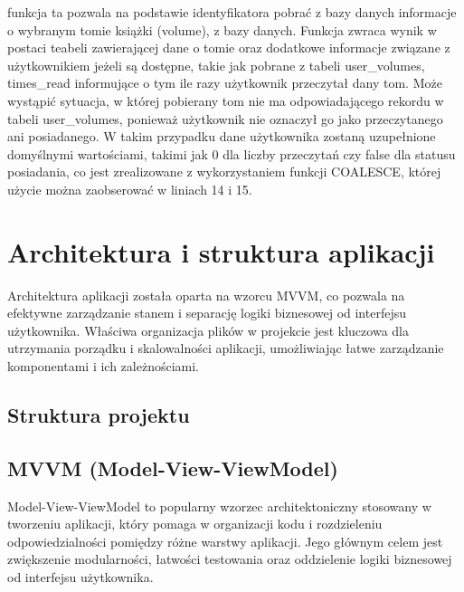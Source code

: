 \documentclass[12pt,twoside]{article}
\begin{document}
funkcja ta pozwala na podstawie identyfikatora pobrać z bazy danych informacje o wybranym tomie książki (volume), z bazy
danych. Funkcja zwraca wynik w postaci teabeli zawierającej dane o tomie oraz dodatkowe informacje związane z użytkownikiem
jeżeli są dostępne, takie jak pobrane z tabeli user\_volumes, times\_read informujące o tym ile razy użytkownik przeczytał
dany tom. Może wystąpić sytuacja, w której pobierany tom nie ma odpowiadającego rekordu w tabeli user\_volumes, ponieważ 
użytkownik nie oznaczył go jako przeczytanego ani posiadanego. W takim przypadku dane użytkownika zostaną uzupełnione 
domyślnymi wartościami, takimi jak 0 dla liczby przeczytań czy false dla statusu posiadania, co jest zrealizowane z 
wykorzystaniem funkcji COALESCE, której użycie można zaobserować w liniach 14 i 15.

\clearpage

\section{Architektura i struktura aplikacji}

Architektura aplikacji została oparta na wzorcu MVVM, co pozwala na efektywne zarządzanie stanem i separację 
logiki biznesowej od interfejsu użytkownika. Właściwa organizacja plików w projekcie jest kluczowa dla 
utrzymania porządku i skalowalności aplikacji, umożliwiając łatwe zarządzanie komponentami i ich zależnościami. 

\subsection{Struktura projektu}



\subsection{MVVM (Model-View-ViewModel)}

Model-View-ViewModel to popularny wzorzec architektoniczny stosowany w tworzeniu aplikacji, który pomaga w 
organizacji kodu i rozdzieleniu odpowiedzialności pomiędzy różne warstwy aplikacji. Jego głównym celem
jest zwiększenie modularności, łatwości testowania oraz oddzielenie logiki biznesowej od interfejsu użytkownika.
\end{document}
